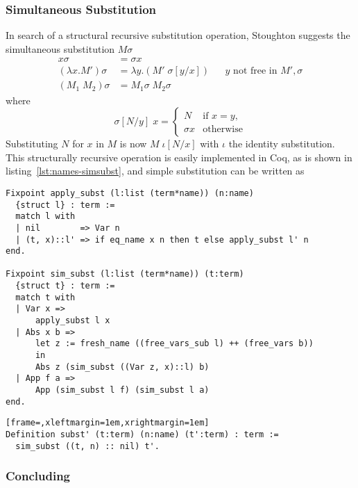 \documentclass[a4paper,11pt]{article}
\begin{document}
\subsubsection*{Simultaneous Substitution}

In search of a structural recursive substitution operation, Stoughton
\cite{Stoughton-88} suggests the simultaneous substitution $M \sigma$
\begin{align*}
  x \sigma              &= \sigma x\\
  (\lambda x.M') \sigma &= \lambda y.(M' \; \sigma[y/x])  && \text{$y$ not free in $M', \sigma$}\\
  (M_1 \; M_2) \sigma   &= M_1 \sigma \; M_2 \sigma
\end{align*}
where
\begin{equation*}
  \sigma[N/y] \; x =
  \begin{cases}
    N        & \text{if $x = y$,}\\
    \sigma x & \text{otherwise}
  \end{cases}
\end{equation*}
Substituting $N$ for $x$ in $M$ is now $M \; \iota [N/x]$ with $\iota$
the identity substitution.
This structurally recursive operation is easily implemented in Coq, as
is shown in listing~\ref{lst:names-simsubst}, and simple substitution
can be written as
\begin{lstlisting}[float,caption={{\small \em (Named variables)} Capture-avoiding simultaneous substitution},label=lst:names-simsubst]
Fixpoint apply_subst (l:list (term*name)) (n:name)
  {struct l} : term :=
  match l with
  | nil        => Var n
  | (t, x)::l' => if eq_name x n then t else apply_subst l' n
end.

Fixpoint sim_subst (l:list (term*name)) (t:term)
  {struct t} : term :=
  match t with
  | Var x =>
      apply_subst l x
  | Abs x b =>
      let z := fresh_name ((free_vars_sub l) ++ (free_vars b))
      in
      Abs z (sim_subst ((Var z, x)::l) b)
  | App f a =>
      App (sim_subst l f) (sim_subst l a)
end.
\end{lstlisting}
\begin{lstlisting}[frame=,xleftmargin=1em,xrightmargin=1em]
Definition subst' (t:term) (n:name) (t':term) : term :=
  sim_subst ((t, n) :: nil) t'.
\end{lstlisting}

\subsubsection*{Concluding} %
\end{document}

